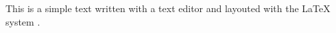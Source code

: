 This is a simple text written with a text editor and layouted with the
{\LaTeX} system \cite[chapter 3]{lamport94}.




